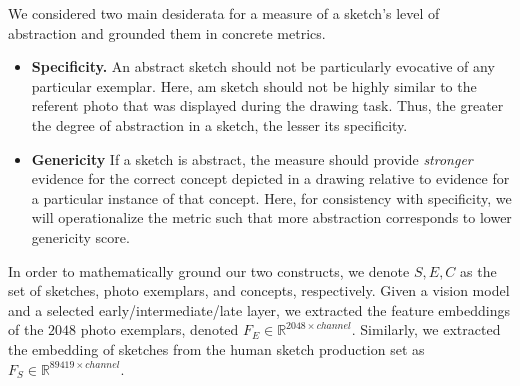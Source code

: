 \documentclass[10pt,letterpaper]{article}
\begin{document}
We considered two main desiderata for a measure of a sketch's level of abstraction and grounded them in concrete metrics. 
\begin{itemize}

    \item \textbf{Specificity.} An abstract sketch should not be particularly evocative of any particular exemplar. Here, am sketch should not be highly similar to the referent photo that was displayed during the drawing task.
    Thus, the greater the degree of abstraction in a sketch, the lesser its specificity.    
    \item \textbf{Genericity} If a sketch is abstract, the measure should provide \textit{stronger} evidence for the correct concept depicted in a drawing relative to evidence for a particular instance of that concept. Here, for consistency with specificity, we will operationalize the metric such that more abstraction corresponds to lower genericity score.

\end{itemize}

In order to mathematically ground our two constructs, we denote $S, E, C$ as the set of sketches, photo exemplars, and concepts, respectively. Given a vision model and a selected early/intermediate/late layer, we extracted the feature embeddings of the $2048$ photo exemplars, denoted $F_{E} \in \mathbb{R}^{2048\times channel}$. Similarly, we extracted the embedding of sketches from the human sketch production set as $F_{S} \in \mathbb{R}^{89419\times channel}$.
\end{document}
